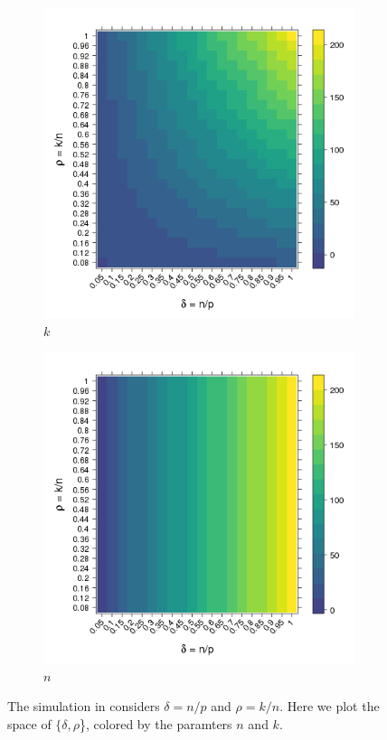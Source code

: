 \documentclass[11pt]{article}
\begin{document}
\begin{figure}[tbhp] 
    \begin{subfigure} [b]{0.5\linewidth}
      \centering
      \includegraphics[totalheight=6cm]{./figs/k.png}
      \caption{$k$}
      \label{figure:k.png}
    \end{subfigure} 
    \begin{subfigure}[b]{0.5\linewidth}
      \centering
      \includegraphics[totalheight=6cm]{./figs/n.png}
      \caption{$n$}
      \label{figure:n.png}
    \end{subfigure} 
    \caption{The simulation in  considers $\delta = n/p$ and $\rho =k/n$. Here we plot the
      space of $\{\delta, \rho$\}, colored  by the paramters $n$ and $k.$}
\end{figure}
\end{document}
